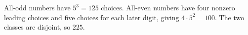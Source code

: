 All-odd numbers have $5^3=125$ choices. All-even numbers have four nonzero leading choices and five choices for each later digit, giving $4\cdot5^2=100$. The two classes are disjoint, so $\boxed{225}$.

